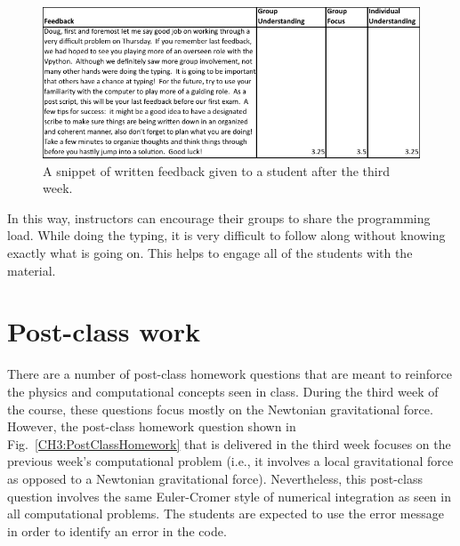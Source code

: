 \documentclass{msuphddissertation}
\begin{document}
\begin{doublespace}
\begin{figure}[ht]\centering
\includegraphics[scale=1.25]{images/CH3WrittenFeedback.pdf}
\caption{A snippet of written feedback given to a student after the third week.}\label{CH3:WrittenFeedback}
\end{figure}

In this way, instructors can encourage their groups to share the programming load.  While doing the typing, it is very difficult to follow along without knowing exactly what is going on.  This helps to engage all of the students with the material.

\section{Post-class work}

There are a number of post-class homework questions that are meant to reinforce the physics and computational concepts seen in class.  During the third week of the course, these questions focus mostly on the Newtonian gravitational force.  However, the post-class homework question shown in Fig.~\ref{CH3:PostClassHomework} that is delivered in the third week focuses on the previous week's computational problem (i.e., it involves a local gravitational force as opposed to a Newtonian gravitational force).  Nevertheless, this post-class question involves the same Euler-Cromer style of numerical integration as seen in all computational problems.  The students are expected to use the error message in order to identify an error in the code.


\end{doublespace}
\end{document}
